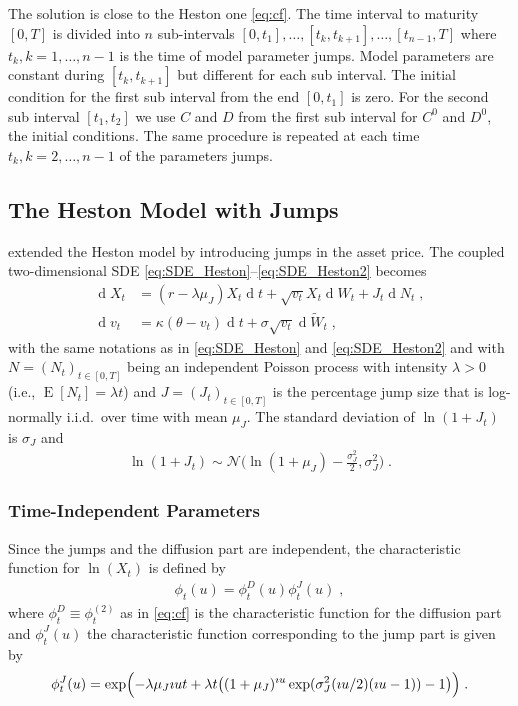 \documentclass[10pt,a4paper]{article}
\numberwithin{equation}{section} %
\theoremstyle{plain}
\theoremstyle{definition}
\theoremstyle{remark}
\def\D{\dif\!}
\def\tT{\ensuremath{{t\in\left[0,T\right]}}}
\DeclareMathOperator{\dif}{d}
\DeclareMathOperator{\Ex}{E}
\begin{document}
\medskip
The solution is close to the Heston one \eqref{eq:cf}. The time interval to maturity $[0,T]$ is divided into $n$ sub-intervals $[0,t_1],\dots,[t_k,t_{k+1}],\dots,[t_{n-1},T]$ where $t_k,k=1,\dots,n-1$ is the time of model parameter jumps. Model parameters are constant during $[t_k,t_{k+1}]$ but different for each sub interval. The initial condition for the first sub interval from the end $[0,t_1]$ is zero. For the second sub interval $[t_1,t_2]$ we use $C$ and $D$ from the first sub interval for $C^0$ and $D^0$, the initial conditions. The same procedure is repeated at each time $t_k,k=2,\dots,n-1$ of the parameters jumps.

\subsection{The Heston Model with Jumps}

\cite{Ba96} extended the Heston model by introducing jumps in the asset price. The coupled two-dimensional SDE \eqref{eq:SDE_Heston}--\eqref{eq:SDE_Heston2} becomes
\begin{align*}
\label{eq:SDE_Bates}
\D X_t&=(r-\lambda\mu_J)X_t\D t+ \sqrt{v_t}X_t\D W_t+J_t\D N_t\;,\\
\D v_t&=\kappa(\theta-v_t)\D t+ \sigma\sqrt{v_t}\D \widetilde{W}_t\;, 
\end{align*}
with the same notations as in \eqref{eq:SDE_Heston} and \eqref{eq:SDE_Heston2} and with $N=(N_t)_{\tT}$ being an independent Poisson process with intensity $\lambda>0$ (i.e., $\Ex[N_t]=\lambda t$) and $J=(J_t)_{\tT}$ is the percentage jump size that is log-normally i.i.d.\ over time with mean $\mu_J$. The standard deviation of $\ln(1+J_t)$ is $\sigma_J$ and
\begin{align*}
\ln(1+J_t)\sim \mathcal{N}\bigl(\ln (1+\mu_J)-\frac{\sigma_J^2}{2},\sigma_J^2\bigr)\;. 
\end{align*}

\subsubsection{Time-Independent Parameters}
\label{subsubsec:TimeIndependentParametersBates}

Since the jumps and the diffusion part are independent, the characteristic function for $\ln(X_t)$ is defined by
\begin{align*}
\phi_t(u)=\phi_t^D(u)\phi_t^J(u)\;,
\end{align*}
where $\phi_t^D\equiv \phi_t^{(2)}$ as in \eqref{eq:cf} is the characteristic function for the diffusion part and $\phi_t^J(u)$ the characteristic function corresponding to the jump part is given by
\begin{align*}
\phi_t^J(u)=\exp\Bigl(-\lambda\mu_J\imath ut+\lambda t\bigl((1+\mu_J)^{\imath u}\exp(\sigma_J^2(\imath u/2)(\imath u-1))-1\bigr)\Bigr)\;.
\end{align*}
\end{document}
